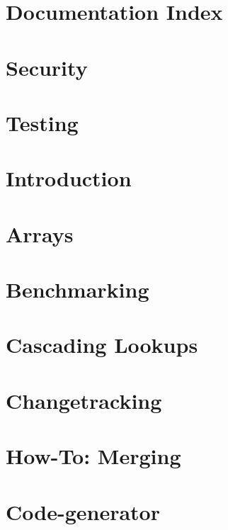 \let\mypdfximage\pdfximage\def\pdfximage{\immediate\mypdfximage}\documentclass[twoside]{book}
\newcommand{\+}{\discretionary{\mbox{\scriptsize$\hookleftarrow$}}{}{}}
\begin{document}
\chapter{Documentation Index}
\label{doc_README_md}

\chapter{Security}
\label{doc_SECURITY_md}

\chapter{Testing}
\label{doc_TESTING_md}

\chapter{Introduction}
\label{doc_tutorials_application-integration_md}

\chapter{Arrays}
\label{doc_tutorials_arrays_md}

\chapter{Benchmarking}
\label{doc_tutorials_benchmarking_md}

\chapter{Cascading Lookups}
\label{doc_tutorials_cascading_md}

\chapter{Changetracking}
\label{doc_tutorials_changetracking_md}

\chapter{How-\/\+To\+: Merging}
\label{doc_tutorials_cmerge_md}

\chapter{Code-\/generator}
\label{doc_tutorials_code-generator_md}

\end{document}
